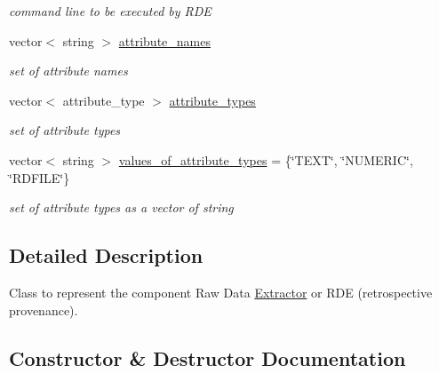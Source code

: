 \begin{DoxyCompactItemize}
\begin{DoxyCompactList}\small\item\em command line to be executed by R\+DE \end{DoxyCompactList}\item 
\mbox{\label{classRawDataExtractor_a23ce52343673f63a56c5c05cf15a3859}} 
vector$<$ string $>$ \hyperlink{classRawDataExtractor_a23ce52343673f63a56c5c05cf15a3859}{attribute\+\_\+names}
\begin{DoxyCompactList}\small\item\em set of attribute names \end{DoxyCompactList}\item 
\mbox{\label{classRawDataExtractor_a0c5d6acb054f65891526b2fe1c5d1cf3}} 
vector$<$ attribute\+\_\+type $>$ \hyperlink{classRawDataExtractor_a0c5d6acb054f65891526b2fe1c5d1cf3}{attribute\+\_\+types}
\begin{DoxyCompactList}\small\item\em set of attribute types \end{DoxyCompactList}\item 
\mbox{\label{classRawDataExtractor_afb4acd3c79f7027051324457cae0bd81}} 
vector$<$ string $>$ \hyperlink{classRawDataExtractor_afb4acd3c79f7027051324457cae0bd81}{values\+\_\+of\+\_\+attribute\+\_\+types} = \{\char`\"{}T\+E\+XT\char`\"{}, \char`\"{}N\+U\+M\+E\+R\+IC\char`\"{}, \char`\"{}R\+D\+F\+I\+LE\char`\"{}\}
\begin{DoxyCompactList}\small\item\em set of attribute types as a vector of string \end{DoxyCompactList}\end{DoxyCompactItemize}


\subsection{Detailed Description}
Class to represent the component Raw Data \hyperlink{classExtractor}{Extractor} or R\+DE (retrospective provenance). 

\subsection{Constructor \& Destructor Documentation}
\mbox{\label{classRawDataExtractor_a5152ed0ab55f6324964cd718572fcb31}} 
